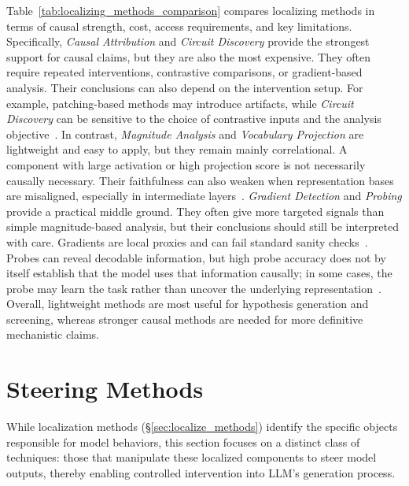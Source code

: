 \documentclass[11pt,letterpaper]{mystyle}
\begin{document}
\begin{tcolorbox}[takeawaysbox, title={Comparative Analysis of Localizing Methods}]
  Table~\ref{tab:localizing_methods_comparison} compares localizing methods in terms of causal strength, cost, access requirements, and key limitations.
  Specifically, \textit{Causal Attribution} and \textit{Circuit Discovery} provide the strongest support for causal claims, but they are also the most expensive. 
  They often require repeated interventions, contrastive comparisons, or gradient-based analysis. Their conclusions can also depend on the intervention setup. For example, patching-based methods may introduce artifacts, while \textit{Circuit Discovery} can be sensitive to the choice of contrastive inputs and the analysis objective~\citep{conmy2023automated}.
  In contrast, \textit{Magnitude Analysis} and \textit{Vocabulary Projection} are lightweight and easy to apply, but they remain mainly correlational. A component with large activation or high projection score is not necessarily causally necessary. Their faithfulness can also weaken when representation bases are misaligned, especially in intermediate layers~\citep{Adebayo2018,syedetal2024attribution}.
  \textit{Gradient Detection} and \textit{Probing} provide a practical middle ground. They often give more targeted signals than simple magnitude-based analysis, but their conclusions should still be interpreted with care. Gradients are local proxies and can fail standard sanity checks~\citep{Adebayo2018}. Probes can reveal decodable information, but high probe accuracy does not by itself establish that the model uses that information causally; in some cases, the probe may learn the task rather than uncover the underlying representation~\citep{hewitt2019designing,ravichander2020probing}.
  Overall, lightweight methods are most useful for hypothesis generation and screening, whereas stronger causal methods are needed for more definitive mechanistic claims.
\end{tcolorbox}

\newpage

\section{Steering Methods}
\label{sec:steer_methods}
While localization methods (§\ref{sec:localize_methods}) identify the specific objects responsible for model behaviors, this section focuses on a distinct class of techniques: those that manipulate these localized components to steer model outputs, thereby enabling controlled intervention into LLM’s generation process.
\end{document}
